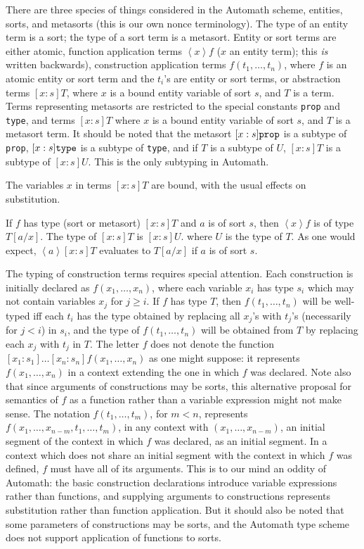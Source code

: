 \documentclass[12pt]{article}
\begin{document}
There are three species of things considered in the Automath scheme, entities, sorts, and metasorts (this is our own nonce terminology).  The type of an entity term is a sort; the type of a sort term is a metasort.  Entity or sort terms are either
atomic, function application terms $\left<x\right>f$ ($x$ an entity term); this {\em is\/} written backwards), construction application terms $f(t_1,\ldots,t_n)$, where $f$ is an atomic entity or sort term and the $t_i$'s are entity or sort terms, or abstraction terms $[x:s]T$, where $x$ is a bound entity variable of sort $s$, and $T$ is a term.  Terms representing metasorts are restricted to the special constants {\tt prop} and  {\tt type}, and terms
$[x:s]T$ where $x$ is a bound entity  variable of sort $s$, and $T$ is a metasort term.  It should be noted that the metasort $[x:s]{\tt prop}$ is a subtype of {\tt prop}, $[x:s]{\tt type}$ is a subtype of {\tt type}, and if $T$ is a subtype of $U$, $[x:s]T$ is a subtype of $[x:s]U$.  This is the only subtyping in Automath.

The variables $x$ in terms $[x:s]T$ are bound, with the usual effects on substitution.

If $f$ has type (sort or metasort) $[x:s]T$ and $a$ is of sort $s$, then $\left<x\right>f$ is of type $T[a/x]$.   The type of
$[x:s]T$ is $[x:s]U$. where $U$ is the type of $T$.   As one would expect, $\left<a\right>[x:s]T$ evaluates to $T[a/x]$ if $a$ is of sort $s$.

The typing of construction terms requires special attention.  Each construction is initially declared as $f(x_1,\ldots,x_n)$, where each variable $x_i$ has type $s_i$ which may not contain variables $x_j$ for $j \geq i$.  If $f$ has type $T$, then $f(t_1,\ldots,t_n)$ will be well-typed iff each $t_i$ has the type obtained
by replacing all $x_j$'s with $t_j$'s (necessarily for $j<i$) in $s_i$, and the type of $f(t_1,\ldots,t_n)$ will be obtained from $T$ by replacing each $x_j$ with $t_j$ in $T$.  The letter $f$ does not denote the function $[x_1:s_1]\ldots[x_n:s_n]f(x_1,\ldots,x_n)$ as one might suppose:  it represents $f(x_1,\ldots,x_n)$ in a context extending the one in which $f$ was declared.  Note also that since arguments of constructions may be sorts, this alternative proposal for semantics of $f$ as a function rather than a variable expression might not make sense.  The notation $f(t_1,\ldots,t_m)$, for $m<n$, represents $f(x_1,\ldots,x_{n-m},t_1,\dots,t_m)$, in any context with $(x_1,\ldots,x_{n-m})$, an initial segment of the context in which $f$ was declared, as an initial segment.  In a context which does not share an initial segment with the context in which $f$ was defined, $f$ must have all of its arguments.  This is to our mind an oddity of Automath:  the basic construction declarations introduce variable expressions rather than functions, and supplying arguments to constructions represents substitution rather than function application.  But it should also be noted that some parameters of constructions may be sorts, and the Automath type scheme does not support application of functions to sorts.
\end{document}
